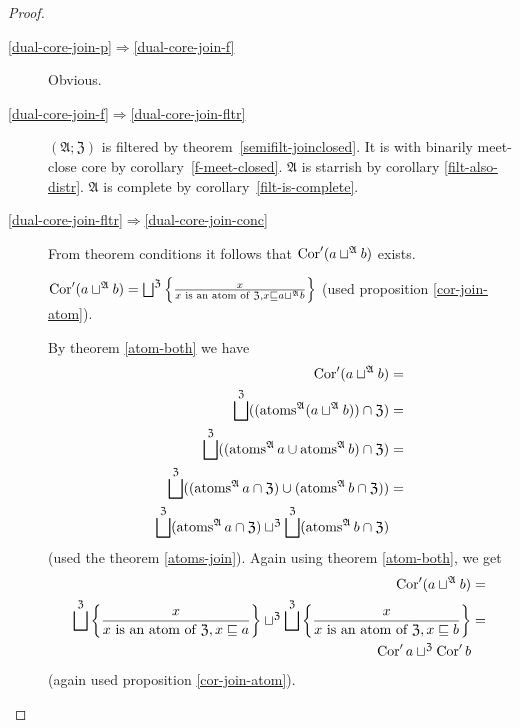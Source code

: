 \begin{proof}
~
\begin{description}
\item [{\ref{dual-core-join-p}$\Rightarrow$\ref{dual-core-join-f}}] Obvious.
\item [{\ref{dual-core-join-f}$\Rightarrow$\ref{dual-core-join-fltr}}] $(\mathfrak{A};\mathfrak{Z})$
is filtered by theorem~\ref{semifilt-joinclosed}. It is with binarily
meet-close core by corollary~\ref{f-meet-closed}. $\mathfrak{A}$ is starrish
by corollary \ref{filt-also-distr}. $\mathfrak{A}$ is complete by
corollary~\ref{filt-is-complete}.
\item [{\ref{dual-core-join-fltr}$\Rightarrow$\ref{dual-core-join-conc}}] From
theorem conditions it follows that $\operatorname{Cor}'(a\sqcup^{\mathfrak{A}}b)$
exists.


$\operatorname{Cor}'(a\sqcup^{\mathfrak{A}}b)=\bigsqcup^{\mathfrak{Z}}\left\{ \frac{x}{x\text{ is an atom of }\mathfrak{Z},x\sqsubseteq a\sqcup^{\mathfrak{A}}b}\right\}$
(used proposition \ref{cor-join-atom}).


By theorem \ref{atom-both} we have
\begin{align*}
\operatorname{Cor}'(a\sqcup^{\mathfrak{A}}b) & =\\
\bigsqcup^{\mathfrak{Z}}((\operatorname{atoms}^{\mathfrak{A}}(a\sqcup^{\mathfrak{A}}b))\cap\mathfrak{Z}) & =\\
\bigsqcup^{\mathfrak{Z}}((\operatorname{atoms}^{\mathfrak{A}}a\cup\operatorname{atoms}^{\mathfrak{A}}b)\cap\mathfrak{Z}) & =\\
\bigsqcup^{\mathfrak{Z}}((\operatorname{atoms}^{\mathfrak{A}}a\cap\mathfrak{Z})\cup(\operatorname{atoms}^{\mathfrak{A}}b\cap\mathfrak{Z})) & =\\
\bigsqcup^{\mathfrak{Z}}(\operatorname{atoms}^{\mathfrak{A}}a\cap\mathfrak{Z})\sqcup^{\mathfrak{Z}}\bigsqcup^{\mathfrak{Z}}(\operatorname{atoms}^{\mathfrak{A}}b\cap\mathfrak{Z})
\end{align*}
(used the theorem \ref{atoms-join}). Again using theorem \ref{atom-both},
we get
\begin{align*}
\operatorname{Cor}'(a\sqcup^{\mathfrak{A}}b) & =\\
\bigsqcup^{\mathfrak{Z}}\left\{ \frac{x}{x\text{ is an atom of }\mathfrak{Z},x\sqsubseteq a}\right\}\sqcup^{\mathfrak{Z}}\bigsqcup^{\mathfrak{Z}}\left\{ \frac{x}{x\text{ is an atom of }\mathfrak{Z},x\sqsubseteq b}\right\} & =\\
\operatorname{Cor}'a\sqcup^{\mathfrak{Z}}\operatorname{Cor}'b
\end{align*}
(again used proposition \ref{cor-join-atom}).

\end{description}
\end{proof}

